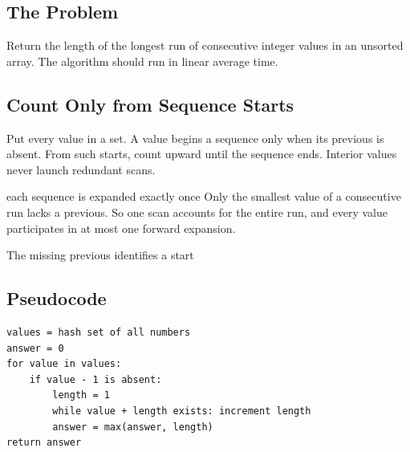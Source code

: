 
\subsection{The Problem}
Return the length of the longest run of consecutive integer values in an
unsorted array. The algorithm should run in linear average time.

\subsection{Count Only from Sequence Starts}
Put every value in a set. A value begins a sequence only when its previous
is absent. From such starts, count upward until the sequence ends. Interior
values never launch redundant scans.

\begin{invariantbox}{each sequence is expanded exactly once}
Only the smallest value of a consecutive run lacks a previous. So
one scan accounts for the entire run, and every value participates in at most
one forward expansion.
\end{invariantbox}

\begin{visualbox}{The missing previous identifies a start}
\centering
{}
\end{visualbox}

\subsection{Pseudocode}
\begin{lstlisting}[style=pseudocode]
values = hash set of all numbers
answer = 0
for value in values:
    if value - 1 is absent:
        length = 1
        while value + length exists: increment length
        answer = max(answer, length)
return answer
\end{lstlisting}

